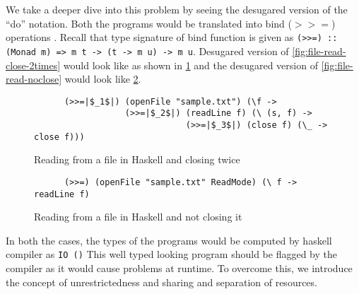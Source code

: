 We take a deeper dive into this problem by seeing the desugared version of the ``do'' notation.
Both the programs would be translated into bind ($>>=$) operations . Recall that type signature of bind function is given as
\texttt{(>>=) :: (Monad m) => m t -> (t -> m u) -> m u}. Desugared version of \cref{fig:file-read-close-2times}
would look like as shown in \cref{fig:file-read-close-2times-desugared}
and the desugared version of \cref{fig:file-read-noclose} would look like \cref{fig:file-read-noclose-desugared}.

\begin{figure}[h]
  \begin{framed}
    \begin{verbatim}
      (>>=|$_1$|) (openFile "sample.txt") (\f ->
                  (>>=|$_2$|) (readLine f) (\ (s, f) ->
                              (>>=|$_3$|) (close f) (\_ -> close f)))
    \end{verbatim}
  \end{framed}
  \caption{Reading from a file in Haskell and closing twice}
  \label{fig:file-read-close-2times-desugared}
\end{figure}

\begin{figure}[h]
  \begin{framed}
    \begin{verbatim}
      (>>=) (openFile "sample.txt" ReadMode) (\ f -> readLine f)
    \end{verbatim}
  \end{framed}
  \caption{Reading from a file in Haskell and not closing it}
  \label{fig:file-read-noclose-desugared}
\end{figure}

In both the cases, the types of the programs would be computed by haskell compiler as \texttt{IO ()}
This well typed looking program should be flagged by the compiler as it would cause problems at runtime.
To overcome this, we introduce the concept of unrestrictedness and sharing and separation of resources.

